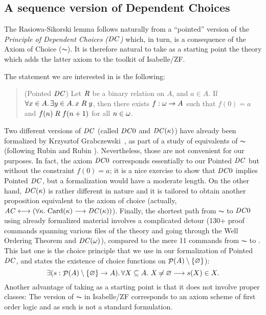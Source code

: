 \subsection{A sequence version of Dependent
  Choices}\label{sec:sequence-version-dc} 
The Rasiowa-Sikorski lemma follows naturally from a ``pointed''
version of   the \emph{Principle of Dependent Choices ($\mathit{DC}$)} which,
in turn, is a consequence of the Axiom of Choice ($\AC$). It is
therefore natural to take as a starting point the theory 
which adds the latter axiom to the toolkit of Isabelle/ZF.

The statement we are interested in is the following:
\begin{quote}
  (Pointed $\mathit{DC}$) Let $\mathrel{R}$ be a binary relation on $A$, and $a\in A$. If
  $\forall x\in A.\,  \exists y\in A.\, x\mathrel{R} y$, then there exists
  $f:\omega\to A$ such that $f(0)=a$ and $f(n)\mathrel{R} f(n+1)$ for all
  $n\in\omega$.
\end{quote}

Two different versions of $\mathit{DC}$ (called $\mathit{DC}0$ and $\mathit{DC}(\kappa)$) have
already been formalized by Krzysztof
Grabczewski~\cite{DBLP:journals/jar/PaulsonG96}, as part of a study of
equivalents of $\AC$ (following Rubin and Rubin
\cite{rubin1985equivalents}). Nevertheless, those are not convenient
for our purposes. In fact, the axiom $\mathit{DC}0$ corresponds essentially to
our Pointed $\mathit{DC}$ but without the constraint $f(0)=a$; it is a nice
exercise to show that $\mathit{DC}0$ implies Pointed $\mathit{DC}$, but a
formalization would have a moderate length. On the other hand,
$\mathit{DC}(\kappa)$ is rather different in nature and it is tailored to
obtain another proposition equivalent to the axiom of choice
(actually,
$\mathit{AC}\longleftrightarrow (\forall \kappa .\;
\mathrm{Card}(\kappa)\longrightarrow \mathit{DC}(\kappa))$).  Finally, the
shortest path from $\AC$ %
to $\mathit{DC}0$ using already formalized
material involves a complicated detour (130+ proof commands spanning
various files of the  theory and going through the Well
Ordering Theorem and  $\mathit{DC}(\omega)$), compared to the mere 11 commands from $\AC$ to
. This last
one is the
choice principle that we use in our formalization of Pointed $\mathit{DC}$, and states 
the existence of
choice functions on $\mathop{\mathcal{P}}(A)\setminus \{\varnothing\}$):
\[
\exists (s: \mathop{\mathcal{P}}(A)\setminus \{\varnothing\}\to A). \, \forall X\subseteq A.\ X\not\nobreak\mkern -2mu = \varnothing \longrightarrow
s(X) \in X.
\]
Another advantage of taking
 as a
starting point is that it does not involve proper classes: The version
of  $\AC$ in Isabelle/ZF corresponds to an axiom scheme of first order
logic and as such is not a standard formulation. 

